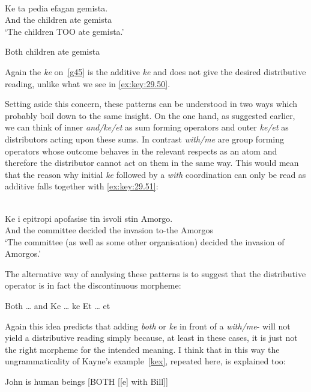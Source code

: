 \documentclass[output=paper]{langsci/langscibook}
\begin{document}
\ea\label{ex:key:29.49} \\
	\gll    Ke ta pedia efagan gemista.\\
            And the children ate gemista\\ \label{g45}
    \glt    \enquote*{The children TOO ate gemista.}
\z

\ea\label{ex:key:29.50}
    Both children ate gemista
\z

Again the \emph{ke} on~\eqref{g45} is the additive \emph{ke} and does not give
the desired distributive reading, unlike what we see in \eqref{ex:key:29.50}.

Setting aside this concern, these patterns can be understood in two ways which
probably boil down to the same insight. On the one hand, as suggested earlier,
we can think of inner \emph{and/ke/et} as sum forming operators and outer
\emph{ke/et} as distributors acting upon these sums. In contrast \emph{with/me}
are group forming operators whose outcome behaves in the relevant respects as
an atom and therefore the distributor cannot act on them in the same way. This
would mean that the reason why initial \emph{ke} followed by a \emph{with}
coordination can only be read as additive falls together with
\eqref{ex:key:29.51}:

\ea\label{ex:key:29.51} \\
	\gll    Ke i epitropi apofasise tin isvoli stin Amorgo.\\
            And the committee decided the invasion to-the Amorgos\\
    \glt    \enquote*{The committee (as well as some other organisation)
    decided the invasion of Amorgos.}
\z

The alternative way of analysing these patterns is to suggest that the
distributive operator is in fact the discontinuous morpheme:

\ea\label{ex:key:29.52}
    \ea Both \ldots{} and
    \ex Ke \ldots{} ke
    \ex Et \ldots{} et
    \z
\z

Again this idea predicts that adding \emph{both} or \emph{ke} in front of a
\emph{with/me}- will not yield a distributive reading simply
because, at least in these cases, it is just not the right morpheme for the
intended meaning. I think that in this way the ungrammaticality of Kayne's
example~\eqref{kex}, repeated here, is explained too:

\ea\label{ex:key:29.53}
    John is human beings [BOTH [[e] with Bill]]
\z
\end{document}
